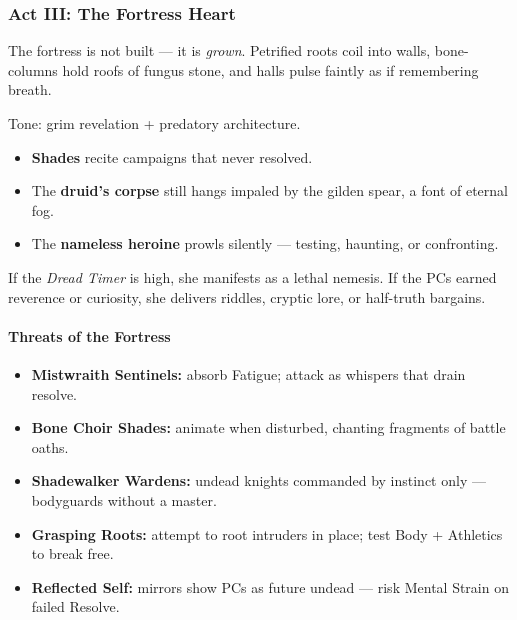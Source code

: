 \documentclass[11pt]{article}
\begin{document}
\subsubsection*{Act III: The Fortress Heart}

The fortress is not built --- it is \textit{grown}.  
Petrified roots coil into walls, bone-columns hold roofs of fungus stone, and halls pulse faintly as if remembering breath.

Tone: grim revelation + predatory architecture.

\begin{itemize}
  \item \textbf{Shades} recite campaigns that never resolved.
  \item The \textbf{druid's corpse} still hangs impaled by the gilden spear, a font of eternal fog.
  \item The \textbf{nameless heroine} prowls silently --- testing, haunting, or confronting.
\end{itemize}

\noindent
If the \emph{Dread Timer } is high, she manifests as a lethal nemesis.  
If the PCs earned reverence or curiosity, she delivers riddles, cryptic lore, or half-truth bargains.

\bigskip

\paragraph{Threats of the Fortress}

\begin{itemize}
  \item \textbf{Mistwraith Sentinels:} absorb Fatigue; attack as whispers that drain resolve.
  \item \textbf{Bone Choir Shades:} animate when disturbed, chanting fragments of battle oaths.
  \item \textbf{Shadewalker Wardens:} undead knights commanded by instinct only --- bodyguards without a master.
  \item \textbf{Grasping Roots:} attempt to root intruders in place; test Body + Athletics to break free.
  \item \textbf{Reflected Self:} mirrors show PCs as future undead --- risk Mental Strain on failed Resolve.
\end{itemize}

\bigskip

\end{document}
